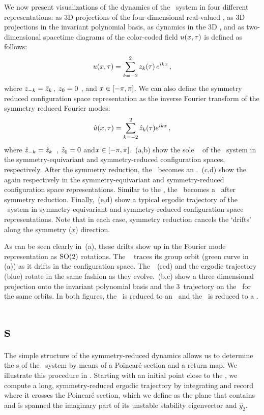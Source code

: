 \documentclass[aip,cha,
reprint,
secnumarabic,
nofootinbib, tightenlines,
nobibnotes, showkeys, showpacs,
superscriptaddress,
]{revtex4-1}
\begin{document}
We now present visualizations of the dynamics of the \twomode\ system in
four different representations: as 3D projections of the four-dimensional
real-valued \statesp, as 3D projections in the invariant polynomial
basis, as dynamics in the 3D \slicePlane, and as two-dimensional
spacetime diagrams of the color-coded field
$u(x,\tau)$ is defined as follows:
\[
	u(x, \tau) = \sum_{k=-2}^{2} z_k(\tau) \, e^{i k x}
\,,
\]
where $z_{-k} = \bar{z}_k \,, \; 	z_0 = 0$ ,  and $x
\in [- \pi, \pi]$. We can also define the symmetry reduced configuration
space representation as the inverse Fourier transform of the symmetry
reduced Fourier modes:
\[
	\hat{u}(x, \tau) = \sum_{k=-2}^{2} \hat{z}_k(\tau) e^{i k x}
\,,
\]
where $\hat{z}_{-k} = \bar{\hat{z}}_k$ \,, \; 	$\hat{z}_0 = 0$ \;
and$x \in [- \pi, \pi]$. \,(a,b) show the
sole \reqv\ \REQV{}{} of the \twomode\ system in the symmetry-equivariant
and symmetry-reduced configuration spaces, respectively. After the
symmetry reduction, the \reqv\ becomes an \eqv.
\,(c,d) show the \rpo\  again
respectively in the symmetry-equivariant and symmetry-reduced
configuration space representations. Similar to the \reqv, the \rpo\
becomes a \po\ after symmetry reduction. Finally,
\,(e,d) show a typical ergodic trajectory of the
\twomode\ system in symmetry-equivariant and symmetry-reduced
configuration space representations. Note that in each case, symmetry
reduction cancels the `drifts' along the symmetry ($x$) direction.

As can be seen clearly in \,(a), these drifts show up 
in the Fourier mode representation as $\textrm{SO}(2)$ rotations. The \reqv\ 
\REQV{}{} traces its  group orbit (green curve in 
\reffig{fig:2modes-ssp}\,(a)) as it drifts in the configuration space. The
\rpo\ \cycle{01}\,(red) and the ergodic trajectory (blue) rotate in the same 
fashion as they evolve. \refFig{fig:2modes-ssp}\,(b,c) show a three 
dimensional projection onto the invariant polynomial basis and the 3\dmn\ 
trajectory on the \slicePlane\ for the same orbits. In both figures, the 
\reqv\ is reduced to an \eqv\ and the \rpo\ is reduced to a \po.

\section{\Po s}
\label{s:numerics}

The simple structure of the symmetry-reduced dynamics allows us to determine 
the \rpo s of the \twomode\ system by means of a Poincar\'e section and a 
return map. We illustrate this procedure in . 
Starting with an initial point close to the \REQV{}{}, we compute a long, 
symmetry-reduced ergodic trajectory by integrating \refeq{e-so2red1stmode} and 
record where it crosses the Poincar\'e section, which we define as the plane 
that contains \REQV{}{} and is spanned the imaginary part of its unstable 
stability eigenvector and $\hat{y}_2$.
\end{document}
